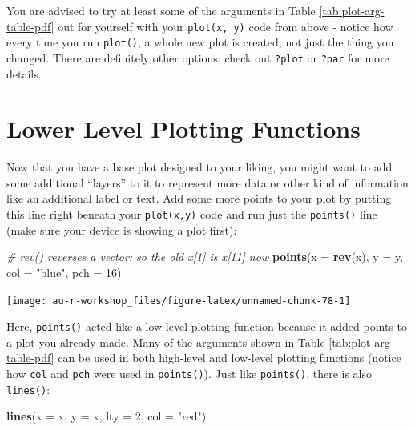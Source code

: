 \documentclass[]{book}
\newenvironment{Shaded}{\begin{snugshade}}{\end{snugshade}}
\newcommand{\KeywordTok}[1]{\textcolor[rgb]{0.13,0.29,0.53}{\textbf{#1}}}
\newcommand{\DataTypeTok}[1]{\textcolor[rgb]{0.13,0.29,0.53}{#1}}
\newcommand{\DecValTok}[1]{\textcolor[rgb]{0.00,0.00,0.81}{#1}}
\newcommand{\StringTok}[1]{\textcolor[rgb]{0.31,0.60,0.02}{#1}}
\newcommand{\CommentTok}[1]{\textcolor[rgb]{0.56,0.35,0.01}{\textit{#1}}}
\newcommand{\NormalTok}[1]{#1}
\theoremstyle{definition}
\theoremstyle{definition}
\theoremstyle{definition}
\theoremstyle{remark}
\begin{document}
You are advised to try at least some of the arguments in Table
\ref{tab:plot-arg-table-pdf} out for yourself with your
\texttt{plot(x,\ y)} code from above - notice how every time you run
\texttt{plot()}, a whole new plot is created, not just the thing you
changed. There are definitely other options: check out \texttt{?plot} or
\texttt{?par} for more details.

\section{Lower Level Plotting
Functions}\label{lower-level-plotting-functions}

Now that you have a base plot designed to your liking, you might want to
add some additional ``layers'' to it to represent more data or other
kind of information like an additional label or text. Add some more
points to your plot by putting this line right beneath your
\texttt{plot(x,y)} code and run just the \texttt{points()} line (make
sure your device is showing a plot first):

\begin{Shaded}
\begin{Highlighting}[]
\CommentTok{# rev() reverses a vector: so the old x[1] is x[11] now}
\KeywordTok{points}\NormalTok{(}\DataTypeTok{x =} \KeywordTok{rev}\NormalTok{(x), }\DataTypeTok{y =}\NormalTok{ y, }\DataTypeTok{col =} \StringTok{"blue"}\NormalTok{, }\DataTypeTok{pch =} \DecValTok{16}\NormalTok{)}
\end{Highlighting}
\end{Shaded}

\begin{center}\texttt{[image: au-r-workshop\_files/figure-latex/unnamed-chunk-78-1]} \end{center}

Here, \texttt{points()} acted like a low-level plotting function because
it added points to a plot you already made. Many of the arguments shown
in Table \ref{tab:plot-arg-table-pdf} can be used in both high-level and
low-level plotting functions (notice how \texttt{col} and \texttt{pch}
were used in \texttt{points()}). Just like \texttt{points()}, there is
also \texttt{lines()}:

\begin{Shaded}
\begin{Highlighting}[]
\KeywordTok{lines}\NormalTok{(}\DataTypeTok{x =}\NormalTok{ x, }\DataTypeTok{y =}\NormalTok{ x, }\DataTypeTok{lty =} \DecValTok{2}\NormalTok{, }\DataTypeTok{col =} \StringTok{"red"}\NormalTok{)}
\end{Highlighting}
\end{Shaded}
\end{document}
